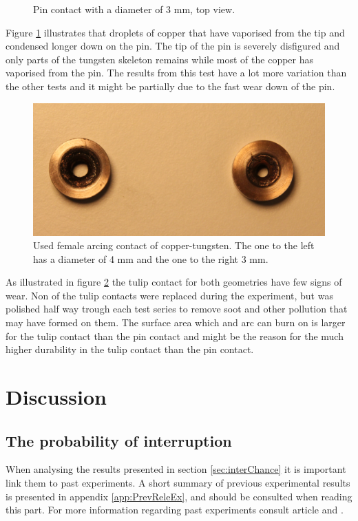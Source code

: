 \documentclass[10pt,a4paper,twoside]{article}
\begin{document}
\begin{figure}[H]
\begin{minipage}{.5\textwidth}
  \caption{Pin contact with a diameter of 3 mm, \newline top view.}
  \label{fig:d3_burn_top}
\end{minipage}
\end{figure}

Figure \ref{fig:d3_burn_top} illustrates that droplets of copper that have vaporised from the tip and condensed longer down on the pin. The tip of the pin is severely disfigured and only parts of the tungsten skeleton remains while most of the copper has vaporised from the pin. The results from this test have a lot more variation than the other tests and it might be partially due to the fast wear down of the pin.  


\begin{figure}[H]
\centering
\includegraphics[scale=0.4]{Bilder/Discussion/femaleContacts4mmand3mm.png}
\caption{Used female arcing contact of copper-tungsten. The one to the left has a diameter of 4 mm and the one to the right 3 mm.} \label{fig:used_d4_d3_female}
\end{figure}

As illustrated in figure \ref{fig:used_d4_d3_female} the tulip contact for both geometries have few signs of wear. Non of the tulip contacts were replaced during the experiment, but was polished half way trough each test series to remove soot and other pollution that may have formed on them. The surface area which and arc can burn on is larger for the tulip contact than the pin contact and might be the reason for the much higher durability in the tulip contact than the pin contact.

\cleardoublepage

\section{Discussion}
\subsection{The probability of interruption} \label{sec:DiscIntChan}
When analysing the results presented in section \ref{sec:interChance} it is important link them to past experiments. A short summary of previous experimental results is presented in appendix \ref{app:PrevReleEx}, and should be consulted when reading this part. For more information regarding past experiments consult article \cite{bib:CIAMVLBS} and \cite{bib:AFIMVLBA}.
\end{document}
